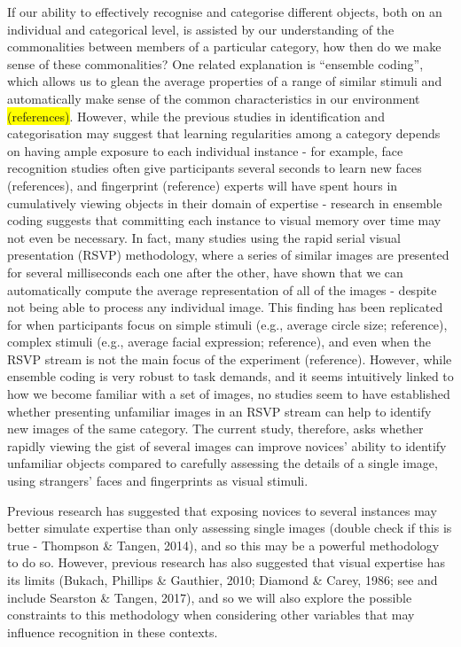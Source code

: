 \documentclass[
  english,
  man]{apa6}
\begin{document}
If our ability to effectively recognise and categorise different objects, both on an individual and categorical level, is assisted by our understanding of the commonalities between members of a particular category, how then do we make sense of these commonalities? One related explanation is ``ensemble coding'', which allows us to glean the average properties of a range of similar stimuli and automatically make sense of the common characteristics in our environment \colorbox{yellow}{(references)}. However, while the previous studies in identification and categorisation may suggest that learning regularities among a category depends on having ample exposure to each individual instance - for example, face recognition studies often give participants several seconds to learn new faces (references), and fingerprint (reference) experts will have spent hours in cumulatively viewing objects in their domain of expertise - research in ensemble coding suggests that committing each instance to visual memory over time may not even be necessary. In fact, many studies using the rapid serial visual presentation (RSVP) methodology, where a series of similar images are presented for several milliseconds each one after the other, have shown that we can automatically compute the average representation of all of the images - despite not being able to process any individual image. This finding has been replicated for when participants focus on simple stimuli (e.g., average circle size; reference), complex stimuli (e.g., average facial expression; reference), and even when the RSVP stream is not the main focus of the experiment (reference). However, while ensemble coding is very robust to task demands, and it seems intuitively linked to how we become familiar with a set of images, no studies seem to have established whether presenting unfamiliar images in an RSVP stream can help to identify new images of the same category. The current study, therefore, asks whether rapidly viewing the gist of several images can improve novices' ability to identify unfamiliar objects compared to carefully assessing the details of a single image, using strangers' faces and fingerprints as visual stimuli.

Previous research has suggested that exposing novices to several instances may better simulate expertise than only assessing single images (double check if this is true - Thompson \& Tangen, 2014), and so this may be a powerful methodology to do so. However, previous research has also suggested that visual expertise has its limits (Bukach, Phillips \& Gauthier, 2010; Diamond \& Carey, 1986; see and include Searston \& Tangen, 2017), and so we will also explore the possible constraints to this methodology when considering other variables that may influence recognition in these contexts.
\end{document}
